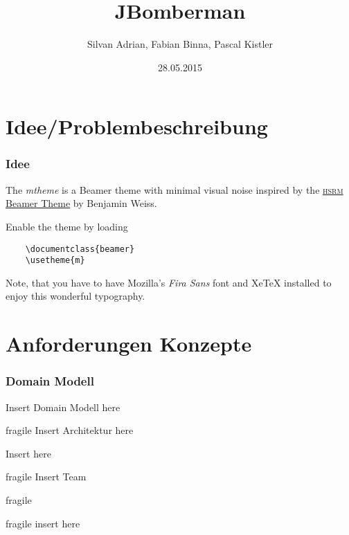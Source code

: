 \documentclass[10pt, compress]{beamer}
\title{JBomberman}
\subtitle{}
\date{28.05.2015}
\author{Silvan Adrian, Fabian Binna, Pascal Kistler}
\institute{Hochschule für Technik Rapperswil}
\begin{document}
\maketitle

\section{Idee/Problembeschreibung}
\begin{frame}[fragile]
  \frametitle{Idee}

  The \emph{mtheme} is a Beamer theme with minimal visual noise inspired by the
  \href{https://github.com/hsrmbeamertheme/hsrmbeamertheme}{\textsc{hsrm} Beamer
  Theme} by Benjamin Weiss.

  Enable the theme by loading

  \begin{verbatim}    \documentclass{beamer}
    \usetheme{m}\end{verbatim}

  Note, that you have to have Mozilla's \emph{Fira Sans} font and XeTeX
  installed to enjoy this wonderful typography.
\end{frame}



\section{Anforderungen  Konzepte}
\begin{frame}[fragile]
  \frametitle{Domain Modell}

    Insert Domain Modell here

\end{frame}

\begin{frame}{fragile}
  Insert Architektur here
\end{frame}


\begin{frame}
    Insert here
\end{frame}


\begin{frame}{fragile}
 Insert Team
\end{frame}
\begin{frame}{fragile}

\end{frame}

\begin{frame}{fragile}
    insert here
\end{frame}
\end{document}
